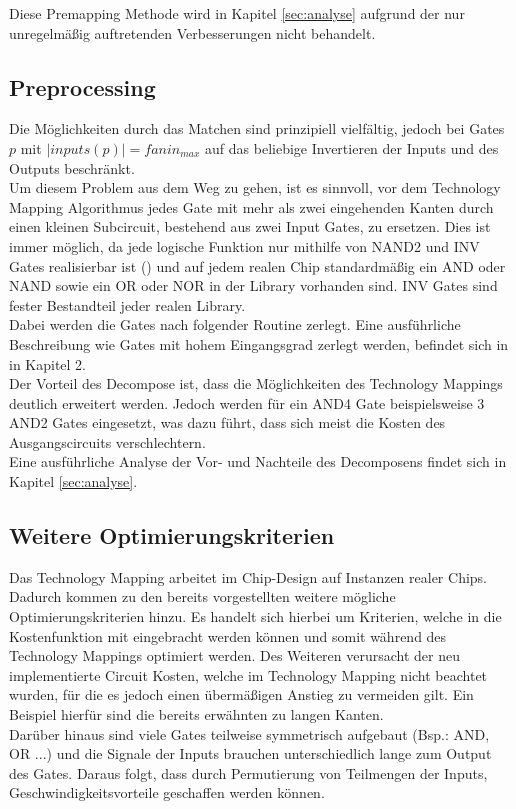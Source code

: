 \documentclass[11pt, a4paper, german]{article}
\newcommand{\TM}{Technology  Mapping }
\begin{document}
Diese Premapping Methode wird in Kapitel \ref{sec:analyse} aufgrund der nur unregelmäßig auftretenden Verbesserungen nicht behandelt.

\subsection{Preprocessing}
Die Möglichkeiten durch das Matchen sind prinzipiell vielfältig, jedoch bei Gates $p$ mit $|inputs(p)| = fanin_{max}$ auf das beliebige Invertieren der Inputs und des Outputs beschränkt. \\
Um diesem Problem aus dem Weg zu gehen, ist es sinnvoll, vor dem \TM Algorithmus jedes Gate mit mehr als zwei eingehenden Kanten durch einen kleinen Subcircuit, bestehend aus zwei Input Gates, zu ersetzen. Dies ist immer möglich, da jede logische Funktion nur mithilfe von NAND2 und INV Gates realisierbar ist (\cite{Post}) und auf jedem realen Chip standardmäßig ein AND oder NAND sowie ein OR oder NOR in der Library vorhanden sind. INV Gates sind fester Bestandteil jeder realen Library.\\
Dabei werden die Gates nach folgender Routine zerlegt. Eine ausführliche Beschreibung wie Gates mit hohem Eingangsgrad zerlegt werden, befindet sich in \cite{WerberDiss} in Kapitel 2. \\
Der Vorteil des Decompose ist, dass die Möglichkeiten des Technology Mappings deutlich erweitert werden. Jedoch werden für ein AND4 Gate beispielsweise 3 AND2 Gates eingesetzt, was dazu führt, dass sich meist die Kosten des Ausgangscircuits verschlechtern.\\
Eine ausführliche Analyse der Vor- und Nachteile des Decomposens findet sich in Kapitel \ref{sec:analyse}.

\subsection{Weitere Optimierungskriterien}
\label{sec:weitere_opt_krit}
Das \TM arbeitet im Chip-Design auf Instanzen realer Chips. Dadurch kommen zu den bereits vorgestellten weitere mögliche Optimierungskriterien hinzu. Es handelt sich hierbei um Kriterien, welche in die Kostenfunktion mit eingebracht werden können und somit während des Technology Mappings optimiert werden. Des Weiteren verursacht der neu implementierte Circuit Kosten, welche im \TM nicht beachtet wurden, für die es jedoch einen übermäßigen Anstieg zu vermeiden gilt. Ein Beispiel hierfür sind die bereits erwähnten zu langen Kanten.\\
Darüber hinaus sind viele Gates teilweise symmetrisch aufgebaut (Bsp.: AND, OR ...) und die Signale der Inputs brauchen unterschiedlich lange zum Output des Gates. Daraus folgt, dass durch Permutierung von Teilmengen der Inputs, Geschwindigkeitsvorteile geschaffen werden können.  
\end{document}
